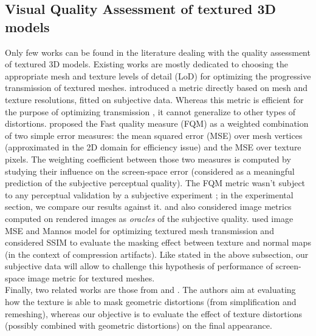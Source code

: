 \subsection{Visual Quality Assessment of textured 3D models}
Only few works can be found in the literature dealing with the quality assessment of textured 3D models. Existing works \cite{Tian_2004,Yang2004,Pan2005} are mostly dedicated to choosing the appropriate mesh and texture levels of detail (LoD) for optimizing the progressive transmission of textured meshes. \cite{Pan2005} introduced a metric directly based on mesh and texture resolutions, fitted on subjective data. Whereas this metric is efficient for the purpose of optimizing transmission \cite{Cheng2007}, it cannot generalize to other types of distortions. \citet{Tian_2004,Tian2008} proposed the Fast quality measure (FQM) as a weighted combination of two simple error measures: the mean squared error (MSE) over mesh vertices (approximated in the 2D domain for efficiency issue) and the MSE over texture pixels. The weighting coefficient between those two measures is computed by studying their influence on the screen-space error (considered as a meaningful prediction of the subjective perceptual quality). The FQM metric wasn't subject to any perceptual validation by a subjective experiment ; in the experimental section, we compare our results against it. \citet{Yang2004} and \citet{Griffin2015} also considered image metrics computed on rendered images as \textit{oracles} of the subjective quality. \citet{Yang2004} used image MSE and Mannos model \cite{Mannos_1974} for optimizing textured mesh transmission and \citet{Griffin2015} considered SSIM \cite{Wang_2004} to evaluate the masking effect between texture and normal maps (in the context of compression artifacts). Like stated in the above subsection, our subjective data will allow to challenge this hypothesis of performance of screen-space image metric for textured meshes. \\
Finally, two related works are those from \citet{FERWERDA:1997} and \citet{Qu2008}. The authors aim at evaluating how the texture is able to mask geometric distortions (from simplification and remeshing), whereas our objective is to evaluate the effect of texture distortions (possibly combined with geometric distortions) on the final appearance.


